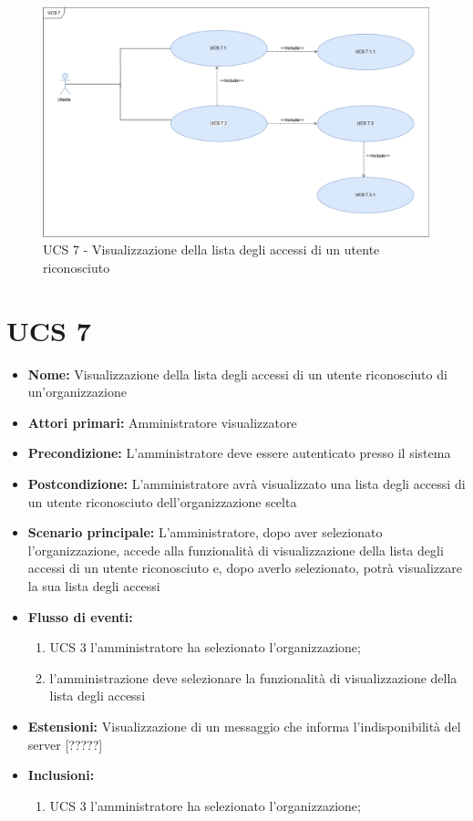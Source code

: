 \begin{figure}[h]
\centering
\includegraphics[scale=0.3]{sezioni/UseCase/Immagini/UCS7.png}%
\caption{UCS 7 - Visualizzazione della lista degli accessi di un utente riconosciuto}
\label{logo}
\end{figure}

\section{UCS 7}%
\begin{itemize}
\item \textbf{Nome:} Visualizzazione della lista degli accessi di un utente riconosciuto di un'organizzazione
\item \textbf{Attori primari:} Amministratore visualizzatore
\item \textbf{Precondizione:} L’amministratore deve essere autenticato presso il sistema
\item \textbf{Postcondizione:} L’amministratore avrà visualizzato una lista degli accessi di un utente riconosciuto dell'organizzazione scelta
\item \textbf{Scenario principale:} L’amministratore, dopo aver selezionato l'organizzazione, accede alla funzionalità di visualizzazione della lista degli accessi di un utente riconosciuto e, dopo averlo selezionato, potrà visualizzare la sua lista degli accessi
\item \textbf{Flusso di eventi:} 
\begin{enumerate}
	\item UCS 3 l'amministratore ha selezionato l'organizzazione;
	\item l'amministrazione deve selezionare la funzionalità di visualizzazione della lista degli accessi
\end{enumerate}
\item \textbf{Estensioni:} Visualizzazione di un messaggio che informa l’indisponibilità del server [?????]
\item \textbf{Inclusioni:}
\begin{enumerate}
	\item UCS 3 l'amministratore ha selezionato l'organizzazione;
\end{enumerate}
\end{itemize}

